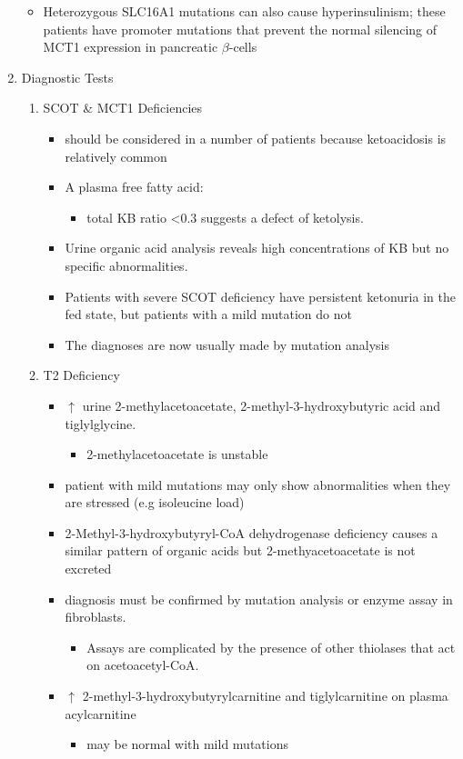 \documentclass{scrartcl}
\begin{document}
\begin{enumerate}
\begin{itemize}
\item Heterozygous SLC16A1 mutations can also cause hyperinsulinism;
these patients have promoter mutations that prevent the normal
silencing of MCT1 expression in pancreatic \(\beta\)-cells
\end{itemize}

\item Diagnostic Tests
\label{sec:org466a473}
\begin{enumerate}
\item SCOT \& MCT1 Deficiencies
\label{sec:org96581fe}
\begin{itemize}
\item should be considered in a number of patients because ketoacidosis is relatively common
\item A plasma free fatty acid:
\begin{itemize}
\item total KB ratio <0.3 suggests a defect of ketolysis.
\end{itemize}
\item Urine organic acid analysis reveals high concentrations of KB but no
specific abnormalities.
\item Patients with severe SCOT deficiency have persistent ketonuria in
the fed state, but patients with a mild mutation do not
\item The diagnoses are now usually made by mutation analysis
\end{itemize}
\item T2 Deficiency
\label{sec:org9391c73}
\begin{itemize}
\item \(\uparrow\) urine 2-methylacetoacetate, 2-methyl-3-hydroxybutyric acid
and tiglylglycine.
\begin{itemize}
\item 2-methylacetoacetate is unstable
\end{itemize}
\item patient with mild mutations may only show abnormalities when they
are stressed (e.g isoleucine load)
\item 2-Methyl-3-hydroxybutyryl-CoA dehydrogenase deficiency causes a
similar pattern of organic acids but 2-methyacetoacetate is not excreted
\item diagnosis must be confirmed by mutation analysis or enzyme assay in fibroblasts.
\begin{itemize}
\item Assays are complicated by the presence of other thiolases that act
on acetoacetyl-CoA.
\end{itemize}
\item \(\uparrow\) 2-methyl-3-hydroxybutyrylcarnitine and
tiglylcarnitine on plasma acylcarnitine
\begin{itemize}
\item may be normal with mild mutations
\end{itemize}
\end{itemize}
\end{enumerate}


\end{enumerate}
\end{document}
